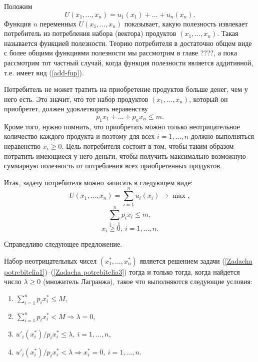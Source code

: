     Положим
\begin{equation}
\label{add-fup}
    U(x_{1},...,x_{n})=u_{1}(x_{1})+\ldots+u_{n}(x_{n}).
\end{equation}
    Функция $n$ переменных $U(x_{1},...,x_{n})$  показывает,
    какую полезность извлекает потребитель из потребления набора
    (вектора) продуктов $(x_{1},...,x_{n})$. Такая называется функцией
    полезности. Теорию потребителя в достаточно общем виде с более общими
    функциями полезности мы рассмотрим в главе ????, а пока рассмотрим тот
    частный случай, когда функция полезности является аддитивной, т.е. имеет вид
    (\ref{add-fup}).


    Потребитель не может тратить на приобретение продуктов больше денег,
    чем у него есть. Это значит, что тот набор продуктов $(x_{1},\ldots,x_{n})$, который он
    приобретет, должен удовлетворять неравенству
    \[p_{1}x_{1}+\ldots+p_{n}x_{n}\leqslant m.\]
    Кроме того, нужно помнить, что приобретать можно только неотрицательное количество
    каждого продукта и поэтому для всех $i=1,\ldots,n$ должно выполняться
    неравенство $x_{i}\geqslant0$.
    Цель потребителя состоит в том, чтобы таким образом потратить
    имеющиеся у него деньги, чтобы получить максимально возможную
    суммарную полезность
       от потребления всех приобретенных продуктов.

    Итак, задачу потребителя можно записать в следующем виде:
    \begin{equation}
    \label{Zadacha potrebitelia1}
    U(x_{1},...,x_{n})=\sum_{i=1}^{n}u_{i}(x_{i})\rightarrow\max,
    \end{equation}
    \begin{equation}
    \label{Zadacha potrebitelia2}
    \sum_{i=1}^{n}p_{i}x_{i}\leqslant m,
    \end{equation}
    \begin{equation}
    \label{Zadacha potrebitelia3}
    x_{i}\geqslant0,\ i=1,\ldots,n.
    \end{equation}

    Справедливо следующее предложение.
\begin{prop}
    \label{opt-potreb}
    Набор неотрицательных чисел $(x^{*}_{1},\ldots,x^{*}_{n})$
    является решением задачи
    (\ref{Zadacha potrebitelia1})--(\ref{Zadacha potrebitelia3})
    тогда и только тогда, когда найдется  число $\lambda\geqslant0$
    (множитель Лагранжа), такое что выполняются следующие условия:
\begin{enumerate}
    \item
    $\sum_{i=1}^{n}p_{i}x^{*}_{i}\leqslant M,$
    \item
    $\sum_{i=1}^{n}p_{i}x^{*}_{i}<M \Rightarrow \lambda=0,$
    \item
    $u'_{i}(x^{*}_{i})/p_{i}x^{*}_{i}\leqslant\lambda,\ i=1,\ldots,n,$
    \item
    $u'_{i}(x^{*}_{i})/p_{i}x^{*}_{i}<\lambda \Rightarrow x^{*}_{i}=0,\ i=1,\ldots,n.$
\end{enumerate}
    \end{prop}

